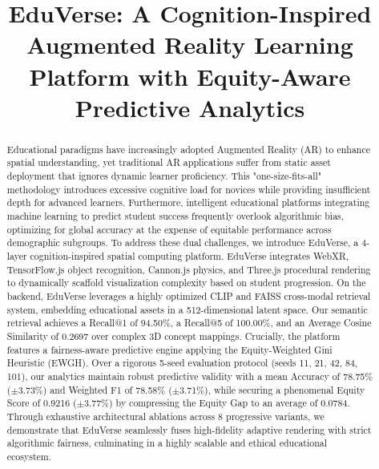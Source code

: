 \documentclass[conference]{IEEEtran}
\begin{document}
\title{EduVerse: A Cognition-Inspired Augmented Reality Learning Platform with Equity-Aware Predictive Analytics}

\author{
\and
{}
}

\maketitle

\begin{abstract}
Educational paradigms have increasingly adopted Augmented Reality (AR) to enhance spatial understanding, yet traditional AR applications suffer from static asset deployment that ignores dynamic learner proficiency. This "one-size-fits-all" methodology introduces excessive cognitive load for novices while providing insufficient depth for advanced learners. Furthermore, intelligent educational platforms integrating machine learning to predict student success frequently overlook algorithmic bias, optimizing for global accuracy at the expense of equitable performance across demographic subgroups. To address these dual challenges, we introduce EduVerse, a 4-layer cognition-inspired spatial computing platform. EduVerse integrates WebXR, TensorFlow.js object recognition, Cannon.js physics, and Three.js procedural rendering to dynamically scaffold visualization complexity based on student progression. On the backend, EduVerse leverages a highly optimized CLIP and FAISS cross-modal retrieval system, embedding educational assets in a 512-dimensional latent space. Our semantic retrieval achieves a Recall@1 of 94.50\%, a Recall@5 of 100.00\%, and an Average Cosine Similarity of 0.2697 over complex 3D concept mappings. Crucially, the platform features a fairness-aware predictive engine applying the Equity-Weighted Gini Heuristic (EWGH). Over a rigorous 5-seed evaluation protocol (seeds 11, 21, 42, 84, 101), our analytics maintain robust predictive validity with a mean Accuracy of 78.75\% ($\pm$3.73\%) and Weighted F1 of 78.58\% ($\pm$3.71\%), while securing a phenomenal Equity Score of 0.9216 ($\pm$3.77\%) by compressing the Equity Gap to an average of 0.0784. Through exhaustive architectural ablations across 8 progressive variants, we demonstrate that EduVerse seamlessly fuses high-fidelity adaptive rendering with strict algorithmic fairness, culminating in a highly scalable and ethical educational ecosystem.
\end{abstract}
\end{document}
